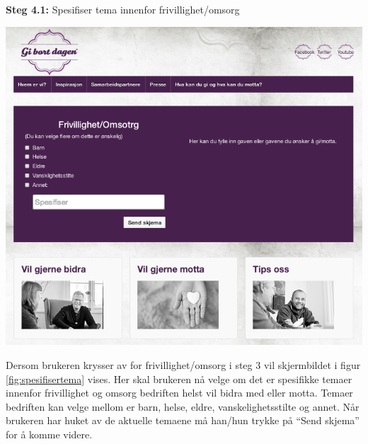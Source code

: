 {\bf Steg 4.1:} Spesifiser tema innenfor frivillighet/omsorg
\begin{center}
\includegraphics[clip=true, width=1 \textwidth,
trim=0cm 0cm 0cm 0cm]{spesifisertema.png}
\label{fig:spesifisertema}
\end{center}

Dersom brukeren krysser av for frivillighet/omsorg i steg 3 vil skjermbildet i figur \ref{fig:spesifisertema} vises. Her skal brukeren nå velge om det er spesifikke temaer innenfor frivillighet og omsorg bedriften helst vil bidra med eller motta. Temaer bedriften kan velge mellom er barn, helse, eldre, vanskelighetsstilte og annet. Når brukeren har huket av de aktuelle temaene må han/hun trykke på “Send skjema” for å komme videre.\\

\newpage


